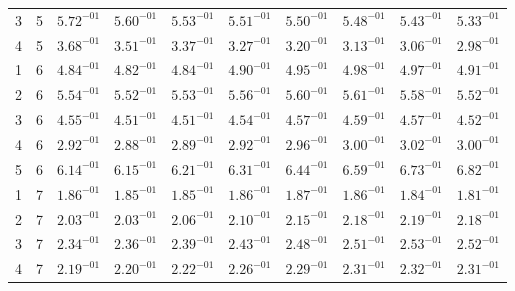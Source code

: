\begin{table}
\begin{tabular}{c c c c c c c c c c}
   3 &    5 & $ 5.72^{-01}$ & $ 5.60^{-01}$ & $ 5.53^{-01}$ & $ 5.51^{-01}$ & $ 5.50^{-01}$ & $ 5.48^{-01}$ & $ 5.43^{-01}$ & $ 5.33^{-01}$ \\%
   4 &    5 & $ 3.68^{-01}$ & $ 3.51^{-01}$ & $ 3.37^{-01}$ & $ 3.27^{-01}$ & $ 3.20^{-01}$ & $ 3.13^{-01}$ & $ 3.06^{-01}$ & $ 2.98^{-01}$ \\%
   1 &    6 & $ 4.84^{-01}$ & $ 4.82^{-01}$ & $ 4.84^{-01}$ & $ 4.90^{-01}$ & $ 4.95^{-01}$ & $ 4.98^{-01}$ & $ 4.97^{-01}$ & $ 4.91^{-01}$ \\%
   2 &    6 & $ 5.54^{-01}$ & $ 5.52^{-01}$ & $ 5.53^{-01}$ & $ 5.56^{-01}$ & $ 5.60^{-01}$ & $ 5.61^{-01}$ & $ 5.58^{-01}$ & $ 5.52^{-01}$ \\%
   3 &    6 & $ 4.55^{-01}$ & $ 4.51^{-01}$ & $ 4.51^{-01}$ & $ 4.54^{-01}$ & $ 4.57^{-01}$ & $ 4.59^{-01}$ & $ 4.57^{-01}$ & $ 4.52^{-01}$ \\%
   4 &    6 & $ 2.92^{-01}$ & $ 2.88^{-01}$ & $ 2.89^{-01}$ & $ 2.92^{-01}$ & $ 2.96^{-01}$ & $ 3.00^{-01}$ & $ 3.02^{-01}$ & $ 3.00^{-01}$ \\%
   5 &    6 & $ 6.14^{-01}$ & $ 6.15^{-01}$ & $ 6.21^{-01}$ & $ 6.31^{-01}$ & $ 6.44^{-01}$ & $ 6.59^{-01}$ & $ 6.73^{-01}$ & $ 6.82^{-01}$ \\%
   1 &    7 & $ 1.86^{-01}$ & $ 1.85^{-01}$ & $ 1.85^{-01}$ & $ 1.86^{-01}$ & $ 1.87^{-01}$ & $ 1.86^{-01}$ & $ 1.84^{-01}$ & $ 1.81^{-01}$ \\%
   2 &    7 & $ 2.03^{-01}$ & $ 2.03^{-01}$ & $ 2.06^{-01}$ & $ 2.10^{-01}$ & $ 2.15^{-01}$ & $ 2.18^{-01}$ & $ 2.19^{-01}$ & $ 2.18^{-01}$ \\%
   3 &    7 & $ 2.34^{-01}$ & $ 2.36^{-01}$ & $ 2.39^{-01}$ & $ 2.43^{-01}$ & $ 2.48^{-01}$ & $ 2.51^{-01}$ & $ 2.53^{-01}$ & $ 2.52^{-01}$ \\%
   4 &    7 & $ 2.19^{-01}$ & $ 2.20^{-01}$ & $ 2.22^{-01}$ & $ 2.26^{-01}$ & $ 2.29^{-01}$ & $ 2.31^{-01}$ & $ 2.32^{-01}$ & $ 2.31^{-01}$ \\%

\end{tabular}
\end{table}
